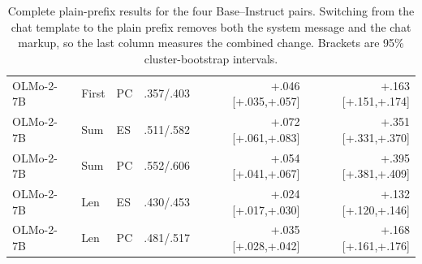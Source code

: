 \begin{table}[t]
\begin{tabular}{lllrrr}
OLMo-2-7B & First & PC & .357/.403 & +.046 [+.035,+.057] & +.163 [+.151,+.174] \\
OLMo-2-7B & Sum & ES & .511/.582 & +.072 [+.061,+.083] & +.351 [+.331,+.370] \\
OLMo-2-7B & Sum & PC & .552/.606 & +.054 [+.041,+.067] & +.395 [+.381,+.409] \\
OLMo-2-7B & Len & ES & .430/.453 & +.024 [+.017,+.030] & +.132 [+.120,+.146] \\
OLMo-2-7B & Len & PC & .481/.517 & +.035 [+.028,+.042] & +.168 [+.161,+.176] \\
\bottomrule
\end{tabular}
\caption{Complete plain-prefix results for the four Base--Instruct pairs. Switching from the chat template to the plain prefix removes both the system message and the chat markup, so the last column measures the combined change. Brackets are 95\% cluster-bootstrap intervals.}
\label{tab:plain-prompt-full}
\end{table}

